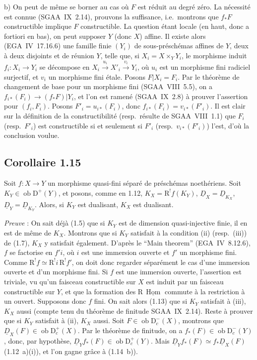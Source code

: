 \documentclass[11pt]{article}
\DeclareMathOperator{\Hom}{Hom}
\newcommand{\R}{\mathrm{R}}\newcommand{\RHomCore}{\mathrm{RHom}}
\newcommand{\D}{\mathrm{D}}
\newcommand{\ob}{\operatorname{ob}}
\providecommand{\Hom}{\operatorname{Hom}}
\providecommand{\ob}{\operatorname{ob}}
\providecommand{\R}{\mathrm R}
\providecommand{\Hom}{\operatorname{Hom}}
\begin{document}
b) On peut de même se borner au cas où $F$ est réduit au degré zéro. La nécessité est connue (SGAA~IX~2.14), prouvons la suffisance, i.e.~montrons que $f_{*}F$ constructible implique $F$ constructible. La question étant locale (en haut, donc a fortiori en bas), on peut supposer $Y$ (donc $X$) affine. Il existe alors (EGA~IV~17.16.6) une famille finie $(Y_i)$ de sous-préschémas affines de $Y$, deux à deux disjoints et de réunion $Y$, telle que, si $X_i = X \times_Y Y_i$, le morphisme induit $f_i : X_i \to Y_i$ se décompose en $X_i \xrightarrow{u_i} X'_i \xrightarrow{v_i} Y_i$, où $u_i$ est un morphisme fini radiciel surjectif, et $v_i$ un morphisme fini étale. Posons $F|X_i = F_i$. Par le théorème de changement de base pour un morphisme fini (SGAA~VIII~5.5), on a $f_{i*}(F_i) \to (f_{*}F)|Y_i$, et l'on est ramené (SGAA~IX~2.8) à prouver l'assertion pour $(f_i, F_i)$. Posons $F'_i = u_{i*}(F_i)$, donc $f_{i*}(F_i) = v_{i*}(F'_i)$. Il est clair sur la définition de la constructibilité (resp.~résulte de SGAA~VIII~1.1) que $F_i$ (resp.~$F'_i$) est constructible si et seulement si $F'_i$ (resp.~$v_{i*}(F'_i)$) l'est, d'où la conclusion voulue.

\subsection*{Corollaire 1.15}
Soit $f : X \to Y$ un morphisme quasi-fini séparé de préschémas noethériens. Soit $K_Y \in \ob \D^{+}(Y)$, et posons, comme en 1.12, $K_X = \R^{!}f(K_Y)$, $\underline{D}_X = \underline{D}_{K_X}$, $\underline{D}_Y = \underline{D}_{K_Y}$. Alors, si $K_Y$ est dualisant, $K_X$ est dualisant.

\emph{Preuve} : On sait déjà (1.5) que si $K_Y$ est de dimension quasi-injective finie, il en est de même de $K_X$. Montrons que si $K_Y$ satisfait à la condition (ii) (resp.~(iii)) de (1.7), $K_X$ y satisfait également. D'après le ``Main theorem'' (EGA~IV~8.12.6), $f$ se factorise en $f'i$, où $i$ est une immersion ouverte et $f'$ un morphisme fini. Comme $\R^{!}f \simeq \R^{!}i \, \R^{!}f'$, on doit donc regarder séparément le cas d'une immersion ouverte et d'un morphisme fini. Si $f$ est une immersion ouverte, l'assertion est triviale, vu qu'un faisceau constructible sur $X$ est induit par un faisceau constructible sur $Y$, et que la formation des $\R\,\underline{\Hom}$ commute à la restriction à un ouvert. Supposons donc $f$ fini. On sait alors (1.13) que si $K_Y$ satisfait à (iii), $K_X$ aussi (compte tenu du théorème de finitude SGAA~IX~2.14). Reste à prouver que si $K_Y$ satisfait à (ii), $K_X$ aussi. Soit $F \in \ob \D_c^{-}(X)$, montrons que $\underline{D}_X(F) \in \ob \D_c^{+}(X)$. Par le théorème de finitude, on a $f_{*}(F) \in \ob \D_c^{-}(Y)$, donc, par hypothèse, $\underline{D}_Y f_{*}(F) \in \ob \D_c^{+}(Y)$. Mais $\underline{D}_Y f_{*}(F) \simeq f_{*}\underline{D}_X(F)$ (1.12~a)(i)), et l'on gagne grâce à (1.14~b)).
\end{document}
